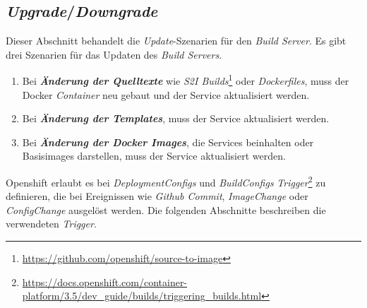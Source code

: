 \subsection{\emph{Upgrade}/\emph{Downgrade}}
\label{sec:buildserver-updates}
Dieser Abschnitt behandelt die \emph{Update}-Szenarien für den \emph{Build Server}. Es gibt drei Szenarien für das Updaten des \emph{Build Servers}.
\begin{enumerate}
	\item Bei \textbf{\emph{Änderung der Quelltexte}} wie \emph{S2I Builds}\footnote{\url{https://github.com/openshift/source-to-image}} oder \emph{Dockerfiles}, muss der Docker \emph{Container} neu gebaut und der Service aktualisiert werden.
	\item Bei \textbf{\emph{Änderung der Templates}}, muss der Service aktualisiert werden.
	\item Bei \textbf{\emph{Änderung der Docker Images}}, die Services beinhalten oder Basisimages darstellen, muss der Service aktualisiert werden.
\end{enumerate}

Openshift erlaubt es bei \emph{DeploymentConfigs} und \emph{BuildConfigs} \emph{Trigger}\footnote{\url{https://docs.openshift.com/container-platform/3.5/dev_guide/builds/triggering_builds.html}} zu definieren, die bei Ereignissen wie \emph{Github Commit}, \emph{ImageChange} oder \emph{ConfigChange} ausgelöst werden. Die folgenden Abschnitte beschreiben die verwendeten \emph{Trigger}.
